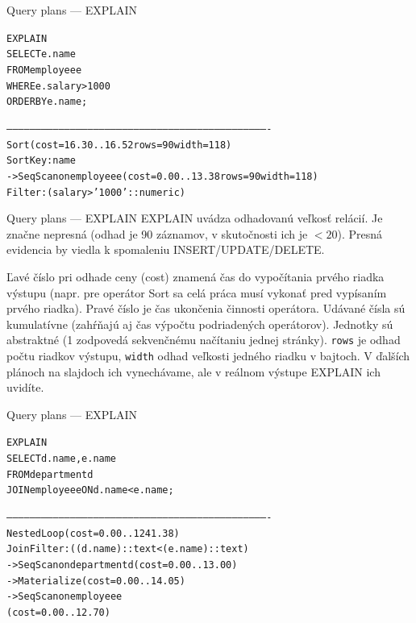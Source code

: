 \documentclass[12pt]{beamer}
\begin{document}
\begin{frame}[fragile]{Query plans --- EXPLAIN}
\begin{alltt}
\alert{EXPLAIN}
SELECT e.name
FROM employee e
WHERE e.salary > 1000
ORDER BY e.name;
\end{alltt}
\scriptsize
\begin{alltt}
----------------------------------------------------------------------------------------------------------------------------------------
 \alert{Sort}  (cost=16.30..16.52 rows=90 width=118)
   Sort Key: name
   ->  Seq Scan on employee e  (cost=0.00..13.38 rows=90 width=118)
         Filter: (salary > '1000'::numeric)
\end{alltt}
\end{frame}

\begin{frame}[fragile]{Query plans --- EXPLAIN}
EXPLAIN uvádza odhadovanú veľkosť relácií. Je značne nepresná (odhad je 90 záznamov, v skutočnosti ich je $< 20$).
Presná evidencia by viedla k spomaleniu INSERT/UPDATE/DELETE.
\bigskip

Ľavé číslo pri odhade ceny (cost) znamená čas do vypočítania prvého riadka výstupu
(napr. pre operátor Sort sa celá práca musí vykonať pred vypísaním prvého riadka).
Pravé číslo je čas ukončenia činnosti operátora.
Udávané čísla sú kumulatívne (zahŕňajú aj čas výpočtu podriadených operátorov).
Jednotky sú abstraktné (1 zodpovedá sekvenčnému načítaniu jednej stránky). \texttt{rows} je odhad počtu riadkov výstupu, \texttt{width} odhad veľkosti jedného riadku v bajtoch. V ďalších plánoch na slajdoch ich vynechávame, ale v reálnom výstupe EXPLAIN ich uvidíte.
\end{frame}



\begin{frame}[fragile]{Query plans --- EXPLAIN}
\begin{alltt}
\alert{EXPLAIN}
SELECT d.name, e.name
FROM department d
JOIN employee e ON d.name < e.name;
\end{alltt}
\scriptsize
\begin{alltt}
----------------------------------------------------------------------------------------------------------------------------------------
\alert{Nested Loop}  (cost=0.00..1241.38)
Join Filter: ((d.name)::text < (e.name)::text)
  ->  Seq Scan on department d  (cost=0.00..13.00)
  ->  Materialize  (cost=0.00..14.05)
        ->  Seq Scan on employee e
            (cost=0.00..12.70)
\end{alltt}
\end{frame}
\end{document}
